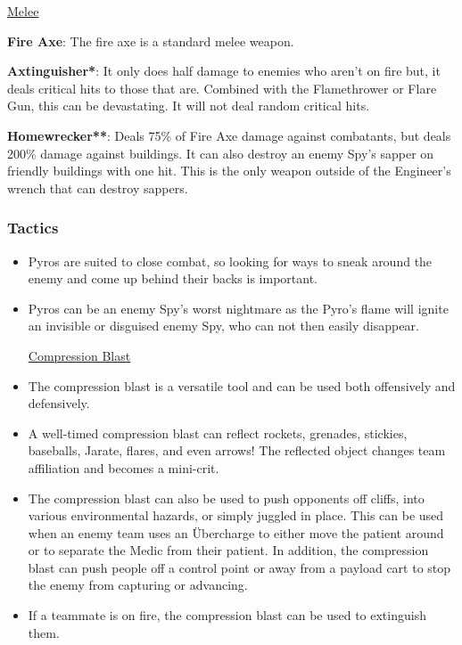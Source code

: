 \newpage

\begin {center}
\underline {Melee}
\end {center}

{\bf Fire Axe}: The fire axe is a standard melee weapon.  

{\bf Axtinguisher*}: It only does half damage to enemies who aren't on fire but, it deals critical hits to those that are. Combined with the Flamethrower or Flare Gun, this can be devastating.  It will not deal random critical hits. 

{\bf Homewrecker**}: Deals 75\% of Fire Axe damage against combatants, but deals 200\% damage against buildings. It can also destroy an enemy Spy's sapper on friendly buildings with one hit. This is the only weapon outside of the Engineer's wrench that can destroy sappers.


\subsubsection {Tactics}
\begin {itemize}
\item Pyros are suited to close combat, so looking for ways to sneak around the enemy and come up behind their backs is important.

\item Pyros can be an enemy Spy's worst nightmare as the Pyro's flame will ignite an invisible or disguised enemy Spy, who can not then easily disappear.
\begin {center}
\underline {Compression Blast}
\end {center}
\item The compression blast is a versatile tool and can be used both offensively and defensively.

\item A well-timed compression blast can reflect rockets, grenades, stickies, baseballs, Jarate, flares, and even arrows! The reflected object changes team affiliation and becomes a mini-crit.

\item The compression blast can also be used to push opponents off cliffs, into various environmental hazards, or simply juggled in place. This can be used when an enemy team uses an Übercharge to either move the patient around or to separate the Medic from their patient. In addition, the compression blast can push people off a control point or away from a payload cart to stop the enemy from capturing or advancing.

\item If a teammate is on fire, the compression blast can be used to extinguish them.
\end {itemize}